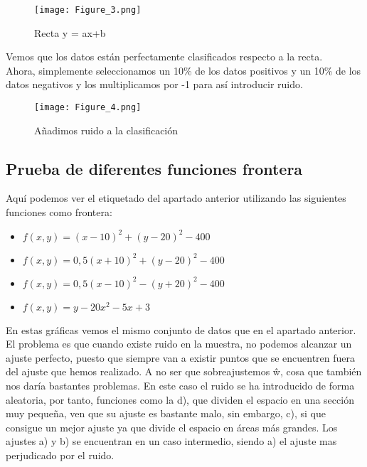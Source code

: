 \begin{figure}[h]
   \centering
   \texttt{[image: Figure\_3.png]}
   \caption{Recta y = ax+b}
\end{figure}

Vemos que los datos están perfectamente clasificados respecto a la recta.\\
Ahora, simplemente seleccionamos un 10\% de los datos positivos y un 10\% de los datos negativos y los multiplicamos por -1 para así introducir ruido.
\begin{figure}[h]
   \centering
   \texttt{[image: Figure\_4.png]}
   \caption{Añadimos ruido a la clasificación}
\end{figure}

\newpage
\subsection{Prueba de diferentes funciones frontera}
Aquí podemos ver el etiquetado del apartado anterior utilizando las siguientes funciones como frontera:
\begin{itemize}
   \item $ f (x, y) = (x − 10)^{2} + (y − 20)^{2} − 400 $
   \item $ f (x, y) = 0,5(x + 10)^{2} + (y − 20)^{2} − 400 $
   \item $ f (x, y) = 0,5(x − 10)^{2} − (y + 20)^{2} − 400 $
   \item $ f (x, y) = y − 20x^{2} − 5x + 3 $
\end{itemize}

En estas gráficas vemos el mismo conjunto de datos que en el apartado anterior. El problema es que cuando existe ruido en la muestra, no podemos alcanzar un ajuste perfecto, puesto que siempre van a existir puntos que se encuentren fuera del ajuste que hemos realizado. A no ser que sobreajustemos ŵ, cosa que también nos daría bastantes problemas. En este caso el ruido se ha introducido de forma aleatoria, por tanto, funciones como la d), que dividen el espacio en una sección muy pequeña, ven que su ajuste es bastante malo, sin embargo, c), si que consigue un mejor ajuste ya que divide el espacio en áreas más grandes. Los ajustes a) y b) se encuentran en un caso intermedio, siendo a) el ajuste mas perjudicado por el ruido.

